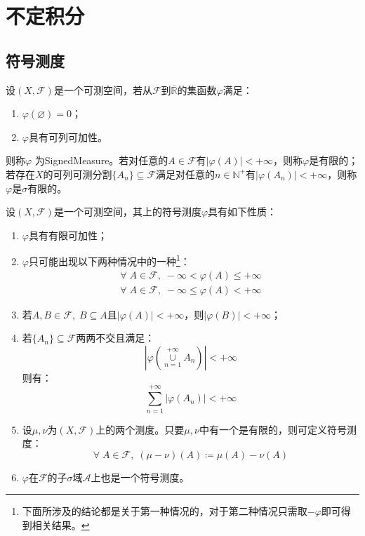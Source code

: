 \section{不定积分}

\subsection{符号测度}
\begin{definition}
	设$(X,\mathscr{F})$是一个可测空间，若从$\mathscr{F}$到$\overline{\mathbb{R}}$的集函数$\varphi$满足：
	\begin{enumerate}
		\item $\varphi(\varnothing)=0$；
		\item $\varphi$具有可列可加性。
	\end{enumerate}
	则称$\varphi$	为\gls{SignedMeasure}。若对任意的$A\in\mathscr{F}$有$|\varphi(A)|<+\infty$，则称$\varphi$是有限的；若存在$X$的可列可测分割$\{A_n\}\subseteq\mathscr{F}$满足对任意的$n\in\mathbb{N}^+$有$|\varphi(A_n)|<+\infty$，则称$\varphi$是$\sigma$有限的。
\end{definition}
\begin{property}\label{prop:SignedMeasure}
	设$(X,\mathscr{F})$是一个可测空间，其上的符号测度$\varphi$具有如下性质：
	\begin{enumerate}
		\item $\varphi$具有有限可加性；
		\item $\varphi$只可能出现以下两种情况中的一种\footnote{下面所涉及的结论都是关于第一种情况的，对于第二种情况只需取$-\varphi$即可得到相关结果。}：
		\begin{gather*}
			\forall\;A\in\mathscr{F},\;-\infty<\varphi(A)\leqslant+\infty \\
			\forall\;A\in\mathscr{F},\;-\infty\leqslant\varphi(A)<+\infty
		\end{gather*}
		\item 若$A,B\in\mathscr{F},\;B\subseteq A$且$|\varphi(A)|<+\infty$，则$|\varphi(B)|<+\infty$；
		\item 若$\{A_n\}\subseteq\mathscr{F}$两两不交且满足：
		\begin{equation*}
			\left|\varphi\left(\underset{n=1}{\overset{+\infty}{\cup}}A_n\right)\right|<+\infty
		\end{equation*}
		则有：
		\begin{equation*}
			\sum_{n=1}^{+\infty}|\varphi(A_n)|<+\infty
		\end{equation*}
		\item 设$\mu,\nu$为$(X,\mathscr{F})$上的两个测度。只要$\mu,\nu$中有一个是有限的，则可定义符号测度：
		\begin{equation*}
			\forall\;A\in\mathscr{F},\;(\mu-\nu)(A)\coloneq\mu(A)-\nu(A)
		\end{equation*}
		\item $\varphi$在$\mathscr{F}$的子$\sigma$域$\mathscr{A}$上也是一个符号测度。
	\end{enumerate}
\end{property}
